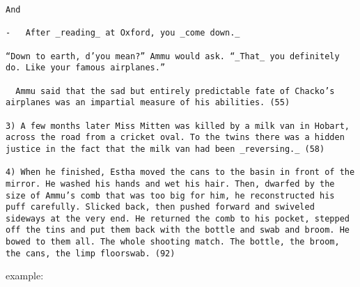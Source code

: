\documentclass[letterpaper]{article}
\begin{document}
\begin{verbatim}
And

-   After _reading_ at Oxford, you _come down._

“Down to earth, d’you mean?” Ammu would ask. “_That_ you definitely do. Like your famous airplanes.”

  Ammu said that the sad but entirely predictable fate of Chacko’s airplanes was an impartial measure of his abilities. (55)

3) A few months later Miss Mitten was killed by a milk van in Hobart, across the road from a cricket oval. To the twins there was a hidden justice in the fact that the milk van had been _reversing._ (58)

4) When he finished, Estha moved the cans to the basin in front of the mirror. He washed his hands and wet his hair. Then, dwarfed by the size of Ammu’s comb that was too big for him, he reconstructed his puff carefully. Slicked back, then pushed forward and swiveled sideways at the very end. He returned the comb to his pocket, stepped off the tins and put them back with the bottle and swab and broom. He bowed to them all. The whole shooting match. The bottle, the broom, the cans, the limp floorswab. (92)
\end{verbatim}

example:
\end{document}
